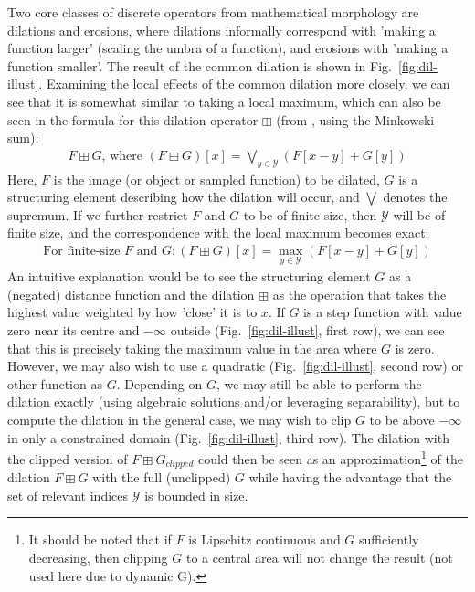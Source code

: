 \documentclass[a4paper, 12pt]{report}
\begin{document}
Two core classes of discrete operators from mathematical morphology are dilations and erosions, where dilations informally correspond with 'making a function larger' (scaling the umbra of a function), and erosions with 'making a function smaller'. The result of the common dilation is shown in Fig.\ \ref{fig:dil-illust}. Examining the local effects of the common dilation more closely, we can see that it is somewhat similar to taking a local maximum, which can also be seen in the formula for this dilation operator $\boxplus$  (from \cite{heijmans1996morphological}, using the Minkowski sum): 
\begin{align}
F \boxplus G \textrm{, where }(F \boxplus G)[x] = \bigvee_ {y\in\mathcal{Y}} \left(F[x-y] + G[y]\right)	
\end{align}
\noindent
Here, $F$ is the image (or object or sampled function) to be dilated, $G$ is a structuring element describing how the dilation will occur, and $\bigvee$ denotes the supremum. If we further restrict $F$ and $G$ to be of finite size, then $\mathcal{Y}$ will be of finite size, and the correspondence with the local maximum becomes exact:
\begin{align}
\textrm{For finite-size }F\textrm{ and }G: (F \boxplus G)[x] = \max_ {y\in\mathcal{Y}} \left(F[x-y] + G[y]\right)	
\end{align}
 An intuitive explanation would be to see the structuring element $G$ as a (negated) distance function and the dilation $\boxplus$ as the operation that takes the highest value weighted by how 'close' it is to $x$. If $G$ is a step function with value zero near its centre and $-\infty$ outside (Fig.\ \ref{fig:dil-illust}, first row), we can see that this is precisely taking the maximum value in the area where $G$ is zero. However, we may also wish to use a quadratic (Fig.\ \ref{fig:dil-illust}, second row) or other function as $G$. Depending on $G$, we may still be able to perform the dilation exactly (using algebraic solutions and/or leveraging separability), but to compute the dilation in the general case, we may wish to clip $G$ to be above $-\infty$ in only a constrained domain (Fig.\ \ref{fig:dil-illust}, third row). The dilation with the clipped version of $F\boxplus G_{clipped}$ could then be seen as an approximation\footnote{It should be noted that if $F$ is Lipschitz continuous and $G$ sufficiently decreasing, then clipping $G$ to a central area will not change the result (not used here due to dynamic G). 
} of the dilation $F\boxplus G$ with the full (unclipped) $G$ while having the advantage that the set of relevant indices $\mathcal{Y}$ is bounded in size. 
\end{document}
